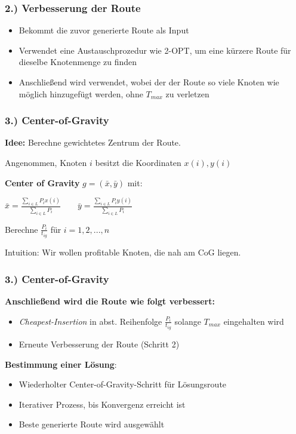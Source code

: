\documentclass{beamer}
\begin{document}
\begin{frame}
  \frametitle{2.) Verbesserung der Route}
  \begin{itemize}
    \item Bekommt die zuvor generierte Route als Input
    \item Verwendet eine Austauschprozedur wie \textsc{2-OPT}, um eine kürzere Route für dieselbe Knotenmenge zu finden
    \item Anschließend wird  verwendet, wobei der der Route so viele Knoten wie möglich hinzugefügt werden,
    ohne $T_{max}$ zu verletzen
  \end{itemize}
\end{frame}

\begin{frame}
  \frametitle{3.) Center-of-Gravity}
  \textbf{Idee:} Berechne gewichtetes Zentrum der Route.\newline

  Angenommen, Knoten $i$ besitzt die Koordinaten $x(i), y(i)$\newline

  \textbf{Center of Gravity} $g = (\bar{x}, \bar{y})$ mit:\newline

  $\bar{x} = \frac{\sum_{i \in L} P_i x(i)}{\sum_{i \in L} P_i} \quad\quad
  \bar{y} = \frac{\sum_{i \in L} P_i y(i)}{\sum_{i \in L} P_i}$\newline

  Berechne $\frac{P_i}{t_{ig}}$ für $i = 1, 2, ..., n$\newline

  Intuition: Wir wollen profitable Knoten, die nah am CoG liegen.
\end{frame}

\begin{frame}
  \frametitle{3.) Center-of-Gravity}
  \textbf{Anschließend wird die Route wie folgt verbessert:}
  \begin{itemize}
    \item \textit{Cheapest-Insertion} in abst. Reihenfolge $\frac{P_i}{t_{ig}}$ solange $T_{max}$ eingehalten wird
    \item Erneute Verbesserung der Route (Schritt 2)
  \end{itemize}
  \textbf{Bestimmung einer Lösung}:
  \begin{itemize}
    \item Wiederholter Center-of-Gravity-Schritt für Lösungsroute
    \item Iterativer Prozess, bis Konvergenz erreicht ist
    \item Beste generierte Route wird ausgewählt
  \end{itemize}
\end{frame}
\end{document}
